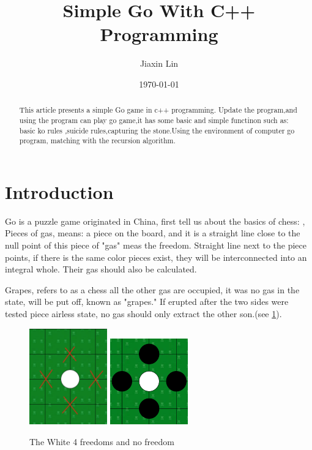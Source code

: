 \documentclass[a4,10pt]{article}
\title{Simple Go With C++ Programming}
\author{Jiaxin Lin}
\date{\today}
\begin{document}
  \maketitle

  \begin{abstract}
    This article presents a simple Go game in c++ programming.
    Update the program,and using the program can play go game,it has some basic and simple functinon such as:
    basic ko rules ,suicide rules,capturing the stone.Using the environment of computer go program,
    matching with the recursion algorithm.
     \end{abstract}


 
  \section{Introduction}



      Go is a puzzle game originated in China, first tell us about the basics of chess:
      , Pieces of gas, means: a piece on the board,
      and it is a straight line close to the null point of this piece of "gas" meas the freedom.
      Straight line next to the piece points, if there is the same color pieces exist,
      they will be interconnected into an integral whole. Their gas should also be calculated.

       Grapes, refers to as a chess all the other gas are occupied, it was no gas in the state, will be put off, known as "grapes."
       If erupted after the two sides were tested piece airless state, no gas should only extract the other son.\cite{he:2009}(see \cref{fig:lena}).
      \begin{figure}[tbp]
      \centering
     \includegraphics[width=0.30\textwidth]{gfx/gas.png}
     \includegraphics[width=0.30\textwidth]{gfx/nogas.png}
     \caption{The White 4 freedoms and no freedom }
     \label{fig:lena}
     \end{figure}
\end{document}

